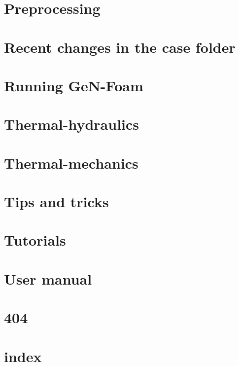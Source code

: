 \documentclass[twoside]{book}
\newcommand{\+}{\discretionary{\mbox{\scriptsize$\hookleftarrow$}}{}{}}
\begin{document}
\chapter{Preprocessing}
\label{PREPROCESSING}

\chapter{Recent changes in the case folder}
\label{CHANGES}

\chapter{Running Ge\+N-\/\+Foam}
\label{RUNNING}

\chapter{Thermal-\/hydraulics}
\label{TH}

\chapter{Thermal-\/mechanics}
\label{TM}

\chapter{Tips and tricks}
\label{TIPS}

\chapter{Tutorials}
\label{TUTORIALS}

\chapter{User manual}
\label{USERMAN}

\chapter{404}
\label{md__home_carlo_data_GeN-Foam_GeN-Foam_ffn_GeN-Foam_GeN-Foam_FMU4FOAM_docs_404}

\chapter{index}
\label{md__home_carlo_data_GeN-Foam_GeN-Foam_ffn_GeN-Foam_GeN-Foam_FMU4FOAM_docs_index}

\end{document}
